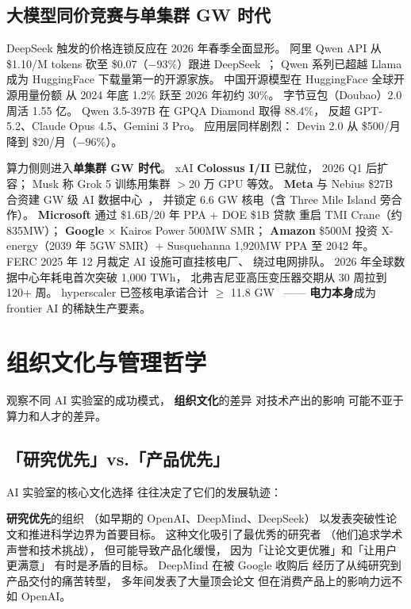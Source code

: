 \subsection{大模型同价竞赛与单集群 GW 时代}

DeepSeek 触发的价格连锁反应在 2026 年春季全面显形。
阿里 Qwen API 从 \$1.10/M tokens
砍至 \$0.07（$-93\%$）跟进 DeepSeek~\cite{qwen_price_war_2026}；
Qwen 系列已超越 Llama 成为 HuggingFace 下载量第一的开源家族。
中国开源模型在 HuggingFace 全球开源用量份额
从 2024 年底 1.2\% 跃至 2026 年初约 30\%。
字节豆包（Doubao）2.0 周活 1.55 亿。
Qwen 3.5-397B 在 GPQA Diamond 取得 88.4\%，
反超 GPT-5.2、Claude Opus 4.5、Gemini 3 Pro。
应用层同样剧烈：
Devin 2.0 从 \$500/月 降到 \$20/月（$-96\%$）。

算力侧则进入\textbf{单集群 GW 时代}。
xAI \textbf{Colossus I/II} 已就位，
2026 Q1 后扩容；
Musk 称 Grok 5 训练用集群 $>$20 万 GPU 等效。
\textbf{Meta} 与 Nebius \$27B 合资建 GW 级 AI 数据中心~\cite{meta_nebius_jv_2026}，
并锁定 6.6 GW 核电（含 Three Mile Island 旁合作）。
\textbf{Microsoft} 通过 \$1.6B/20 年 PPA + DOE \$1B 贷款
重启 TMI Crane（约 835MW）；
\textbf{Google} $\times$ Kairos Power 500MW SMR；
\textbf{Amazon} \$500M 投资 X-energy（2039 年 5GW SMR）+
Susquehanna 1,920MW PPA 至 2042 年。
FERC 2025 年 12 月裁定 AI 设施可直挂核电厂、
绕过电网排队。
2026 年全球数据中心年耗电首次突破 1,000 TWh，
北弗吉尼亚高压变压器交期从 30 周拉到 120+ 周。
hyperscaler 已签核电承诺合计 $\geq$ 11.8 GW%
~\cite{datacenter_nuclear_ppas_2026}——
\textbf{电力本身}成为 frontier AI 的稀缺生产要素。

\section{组织文化与管理哲学}
\label{sec:org-culture}

观察不同 AI 实验室的成功模式，
\textbf{组织文化}的差异
对技术产出的影响
可能不亚于算力和人才的差异。

\subsection{「研究优先」vs.「产品优先」}

AI 实验室的核心文化选择
往往决定了它们的发展轨迹：

\textbf{研究优先}的组织
（如早期的 OpenAI、DeepMind、DeepSeek）
以发表突破性论文和推进科学边界为首要目标。
这种文化吸引了最优秀的研究者
（他们追求学术声誉和技术挑战），
但可能导致产品化缓慢，
因为「让论文更优雅」和「让用户更满意」
有时是矛盾的目标。
DeepMind 在被 Google 收购后
经历了从纯研究到产品交付的痛苦转型，
多年间发表了大量顶会论文
但在消费产品上的影响力远不如 OpenAI。

